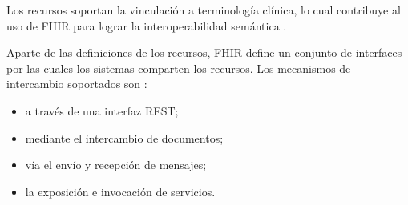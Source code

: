 Los recursos soportan la vinculación a terminología clínica, lo cual contribuye al uso de FHIR para lograr la interoperabilidad semántica \cite{FHIRArchitecture}.

Aparte de las definiciones de los recursos, FHIR define un conjunto de interfaces por las cuales los sistemas comparten los recursos. Los mecanismos de intercambio soportados son \cite{FHIRClinician}:
\begin{itemize}
  \item a través de una interfaz REST;
  \item mediante el intercambio de documentos;
  \item vía el envío y recepción de mensajes;
  \item la exposición e invocación de servicios.
\end{itemize}
